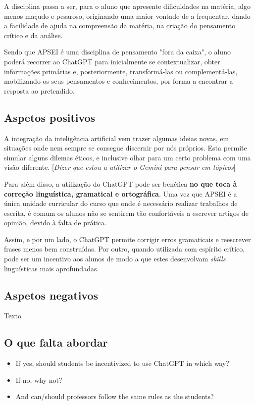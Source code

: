 \documentclass[portuguese, 11pt, a4paper, titlepage, oneside]{article}
\begin{document}
A disciplina passa a ser, para o aluno que apresente dificuldades na matéria, algo menos maçudo e pesaroso, originando uma maior vontade de a frequentar, dando a facilidade de ajuda na compreensão da matéria, na criação do pensamento crítico e da análise.

Sendo que APSEI é uma disciplina de pensamento "fora da caixa", o aluno poderá recorrer ao ChatGPT para inicialmente se contextualizar, obter informações primárias e, posteriormente, transformá-las ou complementá-las, mobilizando os seus pensamentos e conhecimentos, por forma a encontrar a resposta ao pretendido.

\subsection{Aspetos positivos}
A integração da inteligência artificial vem trazer algumas ideias novas, em situações onde nem sempre se consegue discernir por nós próprios. Esta permite simular alguns dilemas éticos, e inclusive olhar para um certo problema com uma visão diferente. [\textit{Dizer que estou a utilizar o Gemini para pensar em tópicos}]

Para além disso, a utilização do ChatGPT pode ser benéfica \textbf{no que toca à correção linguística, gramatical e ortográfica}. Uma vez que APSEI é a única unidade curricular do curso que onde é necessário realizar trabalhos de escrita, é comum os alunos não se sentirem tão confortáveis a escrever artigos de opinião, devido à falta de prática.

Assim, e por um lado, o ChatGPT permite corrigir erros gramaticais e reescrever frases menos bem construídas. Por outro, quando utilizada com espírito crítico, pode ser um incentivo aos alunos de modo a que estes desenvolvam \textit{skills} linguísticas mais aprofundadas.

\subsection{Aspetos negativos}
Texto

\subsection{O que falta abordar}
\begin{itemize}
  \item If yes, should students be incentivized to use ChatGPT in which way?
  \item If no, why not?
  \item And can/should professors follow the same rules as the students?
\end{itemize}
\end{document}
